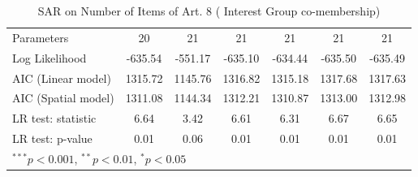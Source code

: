 \begin{table}[!h]
\begin{center}
\begin{tabular}{l c c c c c c }
Parameters              & 20           & 21           & 21           & 21           & 21           & 21           \\
Log Likelihood          & -635.54      & -551.17      & -635.10      & -634.44      & -635.50      & -635.49      \\
AIC (Linear model)      & 1315.72      & 1145.76      & 1316.82      & 1315.18      & 1317.68      & 1317.63      \\
AIC (Spatial model)     & 1311.08      & 1144.34      & 1312.21      & 1310.87      & 1313.00      & 1312.98      \\
LR test: statistic      & 6.64         & 3.42         & 6.61         & 6.31         & 6.67         & 6.65         \\
LR test: p-value        & 0.01         & 0.06         & 0.01         & 0.01         & 0.01         & 0.01         \\
\bottomrule
\multicolumn{7}{l}{\scriptsize{$^{***}p<0.001$, $^{**}p<0.01$, $^*p<0.05$}}
\end{tabular}
\caption{SAR on Number of Items of Art. 8 ( Interest Group co-membership)}
\label{table:coefficients}
\end{center}
\end{table}
